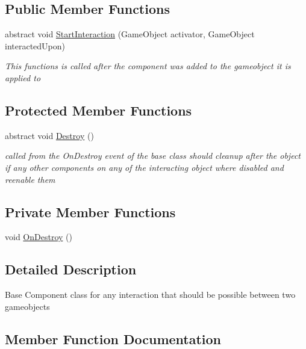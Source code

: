 \subsection*{Public Member Functions}
\begin{DoxyCompactItemize}
\item 
abstract void \mbox{\hyperlink{class_interaction_component_a80d4c2288af453dd9611bbea092843e5}{Start\+Interaction}} (Game\+Object activator, Game\+Object interacted\+Upon)
\begin{DoxyCompactList}\small\item\em This functions is called after the component was added to the gameobject it is applied to \end{DoxyCompactList}\end{DoxyCompactItemize}
\subsection*{Protected Member Functions}
\begin{DoxyCompactItemize}
\item 
abstract void \mbox{\hyperlink{class_interaction_component_aa28f5c9f92b342c3d52f8b0b251fb4fa}{Destroy}} ()
\begin{DoxyCompactList}\small\item\em called from the On\+Destroy event of the base class should cleanup after the object if any other components on any of the interacting object where disabled and reenable them \end{DoxyCompactList}\end{DoxyCompactItemize}
\subsection*{Private Member Functions}
\begin{DoxyCompactItemize}
\item 
void \mbox{\hyperlink{class_interaction_component_a3add77b0cb9df6b962ea2c66d317fa46}{On\+Destroy}} ()
\end{DoxyCompactItemize}


\subsection{Detailed Description}
Base Component class for any interaction that should be possible between two gameobjects 



\subsection{Member Function Documentation}
\mbox{\label{class_interaction_component_aa28f5c9f92b342c3d52f8b0b251fb4fa}} 
